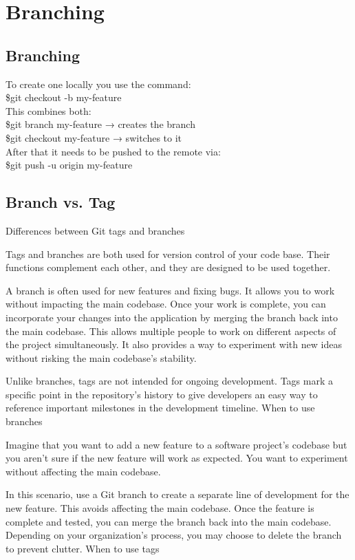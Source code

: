 \chapter{Branching}

\section{Branching}
To create one locally you use the command:\\
\$git checkout -b my-feature\\
This combines both:\\
\$git branch my-feature → creates the branch\\
\$git checkout my-feature → switches to it\\

After that it needs to be pushed to the remote via:\\
\$git push -u origin my-feature\\

\section{Branch vs. Tag}
Differences between Git tags and branches

Tags and branches are both used for version control of your code base. Their functions complement each other, and they are designed to be used together.

A branch is often used for new features and fixing bugs. It allows you to work without impacting the main codebase. Once your work is complete, you can incorporate your changes into the application by merging the branch back into the main codebase. This allows multiple people to work on different aspects of the project simultaneously. It also provides a way to experiment with new ideas without risking the main codebase’s stability.

Unlike branches, tags are not intended for ongoing development. Tags mark a specific point in the repository’s history to give developers an easy way to reference important milestones in the development timeline.
When to use branches

Imagine that you want to add a new feature to a software project’s codebase but you aren’t sure if the new feature will work as expected. You want to experiment without affecting the main codebase.

In this scenario, use a Git branch to create a separate line of development for the new feature. This avoids affecting the main codebase. Once the feature is complete and tested, you can merge the branch back into the main codebase. Depending on your organization’s process, you may choose to delete the branch to prevent clutter.
When to use tags

